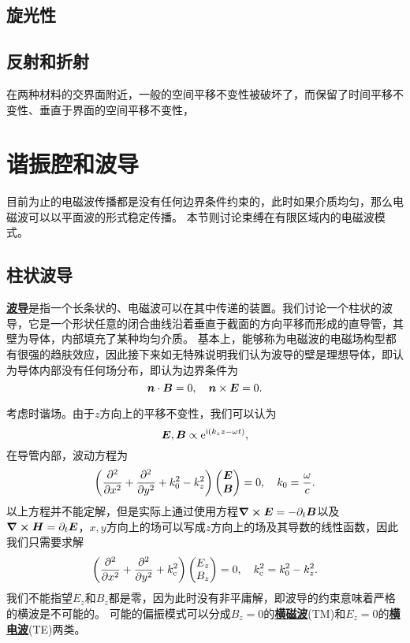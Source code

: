 \documentclass[UTF8, a4paper]{ctexart}
\newcommand*{\ee}{\mathrm{e}}
\newcommand*{\ii}{\mathrm{i}}
\newcommand*{\concept}[1]{\underline{\textbf{#1}}}
\begin{document}
\subsection{旋光性}

\subsection{反射和折射}

在两种材料的交界面附近，一般的空间平移不变性被破坏了，而保留了时间平移不变性、垂直于界面的空间平移不变性，

\section{谐振腔和波导}

目前为止的电磁波传播都是没有任何边界条件约束的，此时如果介质均匀，那么电磁波可以以平面波的形式稳定传播。
本节则讨论束缚在有限区域内的电磁波模式。

\subsection{柱状波导}

\concept{波导}是指一个长条状的、电磁波可以在其中传递的装置。我们讨论一个柱状的波导，它是一个形状任意的闭合曲线沿着垂直于截面的方向平移而形成的直导管，其壁为导体，内部填充了某种均匀介质。
基本上，能够称为电磁波的电磁场构型都有很强的趋肤效应，因此接下来如无特殊说明我们认为波导的壁是理想导体，即认为导体内部没有任何场分布，即认为边界条件为
\begin{equation}
    \vb*{n} \cdot \vb*{B} = 0, \quad \vb*{n} \times \vb*{E} = 0.
\end{equation}

考虑时谐场。由于$z$方向上的平移不变性，我们可以认为
\[
    \vb*{E}, \vb*{B} \propto \ee^{\ii (k_z z - \omega t)},
\]
在导管内部，波动方程为
\begin{equation}
    \left( \pdv[2]{x} + \pdv[2]{y} + k_0^2 - k_z^2 \right) \pmqty{\vb*{E} \\ \vb*{B}} = 0, \quad k_0 = \frac{\omega}{c}.
\end{equation}
以上方程并不能定解，但是实际上通过使用方程$\curl{\vb*{E}}=-\partial_t \vb*{B}$以及$\curl{\vb*{H}} = \partial_t \vb*{E}$，$x, y$方向上的场可以写成$z$方向上的场及其导数的线性函数，因此我们只需要求解
\begin{equation}
    \left( \pdv[2]{x} + \pdv[2]{y} + k_\text{c}^2 \right) \pmqty{E_z \\ B_z} = 0, \quad k_\text{c}^2 = k_0^2 - k_z^2.
\end{equation}
我们不能指望$E_z$和$B_z$都是零，因为此时没有非平庸解，即波导的约束意味着严格的横波是不可能的。
可能的偏振模式可以分成$B_z=0$的\concept{横磁波}(TM)和$E_z=0$的\concept{横电波}(TE)两类。
\end{document}
